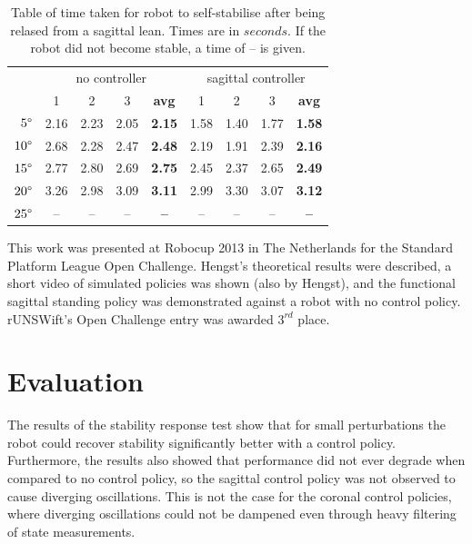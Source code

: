 \begin{table}[h]
  \centering
    \begin{tabular}{ r|cccc|cccc| }
    \multicolumn{1}{r}{}
     &  \multicolumn{4}{c}{no controller}
     & \multicolumn{4}{c}{sagittal controller} \\
    \multicolumn{1}{r}{}
     &  \multicolumn{1}{c}{1}
     &  \multicolumn{1}{c}{2}
     &  \multicolumn{1}{c}{3}
     &  \multicolumn{1}{c}{\textbf{avg}}
     &  \multicolumn{1}{c}{1}
     &  \multicolumn{1}{c}{2}
     &  \multicolumn{1}{c}{3}
     &  \multicolumn{1}{c}{\textbf{avg}} \\
    \cline{2-9}
    $5\degree$ & 2.16 & 2.23 & 2.05 & \textbf{2.15} & 1.58 & 1.40 & 1.77 & \textbf{1.58} \\
    $10\degree$ & 2.68 & 2.28 & 2.47 & \textbf{2.48} & 2.19 & 1.91 & 2.39 & \textbf{2.16} \\
    $15\degree$ & 2.77 & 2.80 & 2.69 & \textbf{2.75} & 2.45 & 2.37 & 2.65 & \textbf{2.49} \\
    $20\degree$ & 3.26 & 2.98 & 3.09 & \textbf{3.11} & 2.99 & 3.30 & 3.07 & \textbf{3.12} \\
    $25\degree$ & -- & -- & -- & \textbf{--} & -- & -- & -- & \textbf{--} \\
    \cline{2-9}
    \cline{2-9}
    \end{tabular}
  \caption{Table of time taken for robot to self-stabilise after being relased from a sagittal lean. Times are in $seconds$. If the robot did not become stable, a time of -- is given.}
  \label{tab:results}
\end{table}

This work was presented at Robocup 2013 in The Netherlands for the Standard Platform League Open Challenge. Hengst's theoretical results\cite{bernhard_rl} were described, a short video of simulated policies was shown (also by Hengst), and the functional sagittal standing policy was demonstrated against a robot with no control policy. rUNSWift's Open Challenge entry was awarded $3^{rd}$ place.

\section{Evaluation}

The results of the stability response test show that for small perturbations the robot could recover stability significantly better with a control policy. Furthermore, the results also showed that performance did not ever degrade when compared to no control policy, so the sagittal control policy was not observed to cause diverging oscillations. This is not the case for the coronal control policies, where diverging oscillations could not be dampened even through heavy filtering of state measurements.

